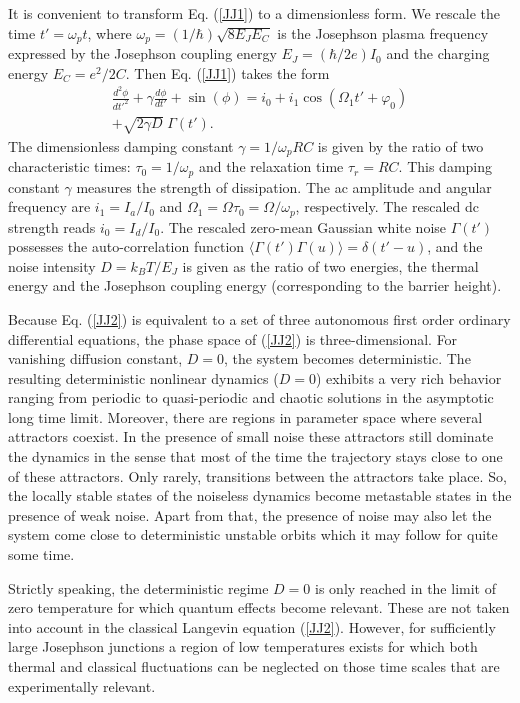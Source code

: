 \documentclass[a4,twocolumn,showpacs,showkeys]{revtex4}
\begin{document}
It is convenient to transform Eq. (\ref{JJ1}) to a dimensionless
form.  We rescale the time $t'=\omega_p t$, where
$\omega_p=(1/\hbar)\sqrt{8 E_JE_C}$ is the Josephson plasma frequency
expressed by the Josephson coupling energy $E_J=(\hbar/2e)I_0$ and the
charging energy $E_C=e^2/2 C$. Then Eq. (\ref{JJ1}) takes the form
\cite{barone,kautz}
%
\begin{eqnarray}
\label{JJ2} \frac{d^2 \phi}{dt'^2} + {\gamma} \frac {d  \phi}{d t'}
+ \sin (\phi)  = i_0 
+ i_1  \cos(\Omega_1 t' +\varphi_0)
 \nonumber \\+ \sqrt{2 \gamma D} \; \Gamma(t').
\end{eqnarray}
%
The dimensionless damping  constant ${\gamma} = 1/\omega_p RC$ is
given by the ratio of two characteristic times: $\tau_0=1/\omega_p$
and the relaxation time $\tau_r = RC$. This damping  constant 
$\gamma$ measures the strength of dissipation. The ac amplitude and 
angular frequency are $i_1 = I_a / I_0$ and
$\Omega_1 = \Omega \tau_0=\Omega/\omega_p$, respectively.  The
rescaled dc strength reads $i_0= I_d/ I_0$. The rescaled zero-mean
Gaussian white noise $\Gamma(t')$ possesses the auto-correlation
function $\langle \Gamma(t')\Gamma(u)\rangle=\delta(t'-u)$, and the
noise intensity $D = k_B T / E_J$ is given as the ratio of two
energies, the thermal energy and the Josephson coupling energy
(corresponding to the barrier height).

Because Eq.  (\ref{JJ2}) is equivalent to a set of three autonomous
first order ordinary differential equations, the phase space of (\ref{JJ2}) is
three-dimensional. For vanishing diffusion constant, $D=0$, the system
becomes deterministic.  The resulting deterministic nonlinear dynamics ($D = 0$)
exhibits a very rich behavior ranging from periodic to quasi-periodic
and chaotic solutions in the asymptotic long time limit. Moreover,
there are regions in parameter space where several attractors coexist.
In the presence of small noise these attractors still dominate the
dynamics in the sense that most of the time the trajectory stays close
to one of these attractors. Only rarely, transitions between the
attractors take place. So, the locally stable states of the noiseless
dynamics become metastable states in the presence of weak noise. 
Apart from that, the presence of noise may also let the system come 
close to deterministic unstable orbits which it may follow for quite some time. 

Strictly speaking, the deterministic regime $D=0$ is only reached in
the limit of zero temperature for which quantum effects become
relevant. These are not taken into account in the classical Langevin
equation (\ref{JJ2}). However, for sufficiently large Josephson
junctions  a region of low temperatures exists
for which both thermal and classical fluctuations can be neglected on
those time scales that are experimentally relevant.
\end{document}
